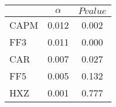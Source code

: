 \begin{tabular}{lcc}
\toprule
 & $\alpha$ & $Pvalue$ \\
\midrule
CAPM & 0.012 & 0.002 \\
FF3 & 0.011 & 0.000 \\
CAR & 0.007 & 0.027 \\
FF5 & 0.005 & 0.132 \\
HXZ & 0.001 & 0.777 \\
\bottomrule
\end{tabular}
